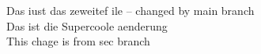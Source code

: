 Das iust das zeweitef ile -- changed by main branch\\
Das ist die Supercoole aenderung \\
This chage is from sec branch \\